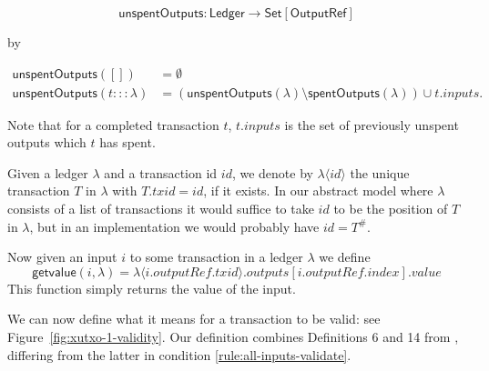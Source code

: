 \documentclass[a4paper]{article}
\newcommand{\s}{\textsf}  %
\theoremstyle{definition}  %
\newcommand{\Set}[1]{\ensuremath{\s{Set}[#1]}}
\newcommand{\mi}[1]{\ensuremath{\mathit{#1}}}
\newcommand{\txid}{\mi{txid}}
\newcommand{\idx}{\mi{index}}
\newcommand{\inputs}{\mi{inputs}}
\newcommand{\outputs}{\mi{outputs}}
\newcommand{\val}{\mi{value}}  %
\newcommand{\outputref}{\mi{outputRef}}
\newcommand{\id}{\mi{id}}
\newcommand{\getvalue}{\msf{getvalue}}
\newcommand{\msf}[1]{\ensuremath{\mathsf{#1}}}
\newcommand{\spent}{\msf{spentOutputs}}
\newcommand{\unspent}{\msf{unspentOutputs}}
\begin{document}
\[
  \unspent : \mathsf{Ledger} \rightarrow \Set{\s{OutputRef}}
\]

\noindent by

\begin{align*}
   \unspent([]) &=\emptyset \\
   \unspent(t:::\lambda) &= (\unspent(\lambda) \setminus \spent(\lambda)) \cup t.\inputs.
\end{align*}

\noindent Note that for a completed transaction $t$, $t.\inputs$ is
the set of previously unspent outputs which $t$ has spent.

\medskip
\noindent Given a ledger $\lambda$ and a transaction id $\id$, we
denote by $\lambda\langle\id\rangle$ the unique transaction $T$ in
$\lambda$ with $T.\txid = \id$, if it exists. In our abstract model
where $\lambda$ consists of a list of transactions it would suffice to
take $id$ to be the position of $T$ in $\lambda$, but in an
implementation we would probably have $id = T^{\#}$.

\medskip
\noindent Now given an input $i$ to some transaction in a ledger
$\lambda$ we define
$$
\getvalue(i,\lambda) = \lambda\langle i.\outputref.\txid \rangle.\outputs[i.\outputref.\idx].\val
$$
This function simply returns the value of the input.

\bigskip

\noindent We can now define what it means for a transaction to be valid: see
Figure~\ref{fig:xutxo-1-validity}.  Our definition combines
Definitions 6 and 14 from \cite{Zahnentferner18-UTxO}, differing from
the latter in condition \ref{rule:all-inputs-validate}.
\end{document}
